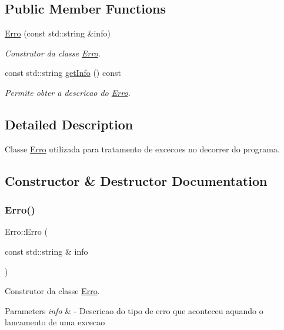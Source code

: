 \subsection*{Public Member Functions}
\begin{DoxyCompactItemize}
\item 
\hyperlink{classErro_a15d79796bd17517ff05d45eee55556f1}{Erro} (const std\+::string \&info)
\begin{DoxyCompactList}\small\item\em Construtor da classe \hyperlink{classErro}{Erro}. \end{DoxyCompactList}\item 
const std\+::string \hyperlink{classErro_abfc1e9735b259d88bb97828a23164eb0}{get\+Info} () const
\begin{DoxyCompactList}\small\item\em Permite obter a descricao do \hyperlink{classErro}{Erro}. \end{DoxyCompactList}\end{DoxyCompactItemize}


\subsection{Detailed Description}
Classe \hyperlink{classErro}{Erro} utilizada para tratamento de excecoes no decorrer do programa. 

\subsection{Constructor \& Destructor Documentation}
\mbox{\label{classErro_a15d79796bd17517ff05d45eee55556f1}} 
\subsubsection{\texorpdfstring{Erro()}{Erro()}}
{\footnotesize\ttfamily Erro\+::\+Erro (\begin{DoxyParamCaption}\item[{const std\+::string \&}]{info }\end{DoxyParamCaption})\hspace{0.3cm}{\ttfamily [inline]}}



Construtor da classe \hyperlink{classErro}{Erro}. 


\begin{DoxyParams}{Parameters}
{\em info} & -\/ Descricao do tipo de erro que aconteceu aquando o lancamento de uma excecao \\
\hline
\end{DoxyParams}

